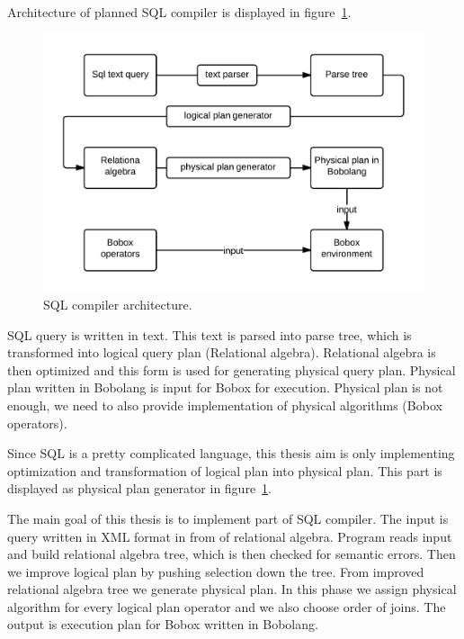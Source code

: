 Architecture of planned SQL compiler is displayed in figure~\ref{fig:sqlarchitecture}. 
\begin{figure}[h!]
  \centering

    \includegraphics[width=1\textwidth]{sqlarchitecture}
    
      \caption{SQL compiler architecture.}
        \label{fig:sqlarchitecture}
\end{figure}
SQL query is written in text. This text is parsed into parse tree, which is transformed into logical query plan (Relational algebra). Relational algebra is then optimized and this form is used for generating physical query plan. Physical plan written in Bobolang is input for Bobox for execution. Physical plan is not enough, we need to also provide implementation of physical algorithms (Bobox operators).

Since SQL is a pretty complicated language, this thesis aim is only implementing optimization and transformation of logical plan into physical plan. This part is displayed as physical plan generator in figure~\ref{fig:sqlarchitecture}.


The main goal of this thesis is to implement part of SQL compiler. The input is query written in XML format in from of relational algebra. Program reads input and build relational algebra tree, which is then checked for semantic errors. Then we improve logical plan by pushing selection down the tree. From improved relational algebra tree we generate physical plan. In this phase we assign physical algorithm for every logical plan operator and we also choose order of joins. The output is execution plan for Bobox written in Bobolang.
